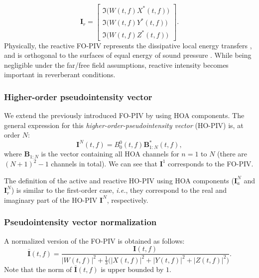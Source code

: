 \begin{equation}
\label{eq:reactiveFOPIV}
    \mathbf{I}_r = \begin{bmatrix} \mathfrak{I}\big(W(t,f) X^*(t,f)\big) \\ \mathfrak{I}\big(W(t,f) Y^*(t,f)\big) \\ \mathfrak{I}\big(W(t,f) Z^*(t,f)\big) \end{bmatrix}.
\end{equation}
Physically, the reactive FO-PIV represents the dissipative local energy transfers \cite{daniel_representation_2001}, and is orthogonal to the surfaces of equal energy of sound pressure \cite{jacobsen_fundamentals_2013,daniel_representation_2001}. While being negligible under the far/free field assumptions, reactive intensity becomes important in reverberant conditions.

\subsubsection{Higher-order pseudointensity vector}

We extend the previously introduced FO-PIV by using HOA components. The general expression for this \textit{higher-order-pseudointensity vector} (HO-PIV) is, at order $N$:
\begin{equation}
    \mathbf{I}^N(t,f) = B_0^0(t,f) \mathbf{B}_{1:N}^*(t,f),
\end{equation}
where $\mathbf{B}_{1:N}$ is the vector containing all HOA channels for $n=1$ to $N$ (there are $(N+1)^2-1$ channels in total). We can see that $\mathbf{I}^1$ corresponds to the FO-PIV. 

The definition of the active and reactive HO-PIV using HOA components ($\mathbf{I}^N_a$ and $\mathbf{I}^N_r$) is similar to the first-order case, \emph{i.e.}, they correspond to the real and imaginary part of the HO-PIV $\mathbf{I}^N$, respectively.

\subsubsection{Pseudointensity vector normalization}

A normalized version of the FO-PIV is obtained as follows:
\begin{equation}
     \bar{\mathbf{I}}(t,f) = \frac{\mathbf{I}(t,f)}{\lvert W(t,f) \rvert^2 + \frac{1}{3} \big(\lvert X(t,f) \rvert^2 + \lvert Y(t,f) \rvert^2 + \lvert Z(t,f) \rvert^2\big)}.
 \end{equation}
Note that the norm of $\bar{\mathbf{I}}(t,f)$ is upper bounded by $1$.

